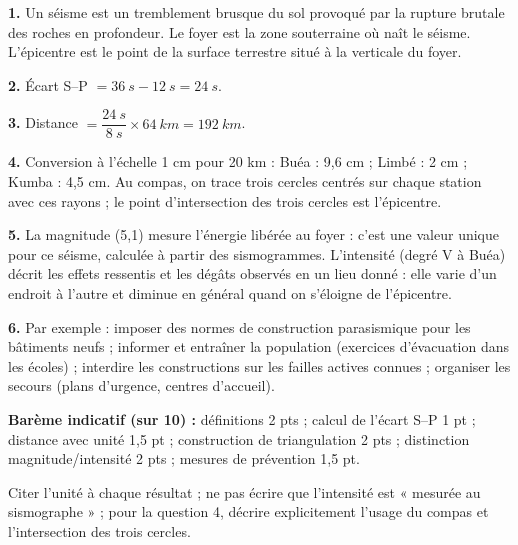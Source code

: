 \documentclass[11pt]{article}
\newcommand{\cle}[1]{{\popxbold\color{popdark}#1}}
\begin{document}
\begin{corrige}
\textbf{1.} Un \cle{séisme} est un tremblement brusque du sol provoqué par la rupture brutale des roches en profondeur. Le \cle{foyer} est la zone souterraine où naît le séisme. L'\cle{épicentre} est le point de la surface terrestre situé à la verticale du foyer.

\textbf{2.} Écart S--P $= \SI{36}{s} - \SI{12}{s} = \SI{24}{s}$.

\textbf{3.} Distance $= \dfrac{\SI{24}{s}}{\SI{8}{s}} \times \SI{64}{km} = \SI{192}{km}$.

\textbf{4.} Conversion à l'échelle 1 cm pour 20 km : Buéa : 9,6 cm ; Limbé : 2 cm ; Kumba : 4,5 cm. Au compas, on trace trois cercles centrés sur chaque station avec ces rayons ; le point d'intersection des trois cercles est l'épicentre.

\textbf{5.} La magnitude (5,1) mesure l'énergie libérée au foyer : c'est une valeur unique pour ce séisme, calculée à partir des sismogrammes. L'intensité (degré V à Buéa) décrit les effets ressentis et les dégâts observés en un lieu donné : elle varie d'un endroit à l'autre et diminue en général quand on s'éloigne de l'épicentre.

\textbf{6.} Par exemple : imposer des normes de construction parasismique pour les bâtiments neufs ; informer et entraîner la population (exercices d'évacuation dans les écoles) ; interdire les constructions sur les failles actives connues ; organiser les secours (plans d'urgence, centres d'accueil).

\textbf{Barème indicatif (sur 10) :} définitions 2 pts ; calcul de l'écart S--P 1 pt ; distance avec unité 1,5 pt ; construction de triangulation 2 pts ; distinction magnitude/intensité 2 pts ; mesures de prévention 1,5 pt.

\begin{attention}
Citer l'unité à chaque résultat ; ne pas écrire que l'intensité est « mesurée au sismographe » ; pour la question 4, décrire explicitement l'usage du compas et l'intersection des trois cercles.
\end{attention}
\end{corrige}
\end{document}

